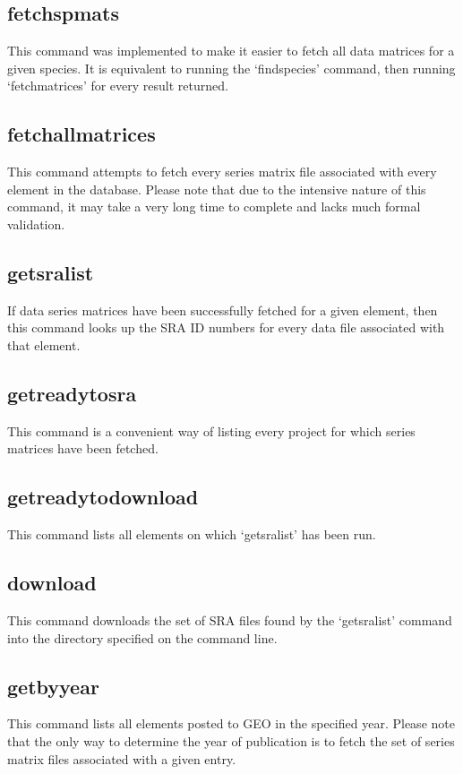 \documentclass[12pt,letterpaper]{article}
\begin{document}
\subsection{fetchspmats}
This command was implemented to make it easier to fetch all data matrices for a given species. It is equivalent to running the `findspecies' command, then running
`fetchmatrices' for every result returned.

\subsection{fetchallmatrices}
This command attempts to fetch every series matrix file associated with every element in the database. Please note that due to the intensive nature of this command,
it may take a very long time to complete and lacks much formal validation.

\subsection{getsralist}
If data series matrices have been successfully fetched for a given element, then this command looks up the SRA ID numbers for every data file associated
with that element.

\subsection{getreadytosra}
This command is a convenient way of listing every project for which series matrices have been fetched.

\subsection{getreadytodownload}
This command lists all elements on which `getsralist' has been run.

\subsection{download}
This command downloads the set of SRA files found by the `getsralist' command into the directory specified on the command line.

\subsection{getbyyear}
This command lists all elements posted to GEO in the specified year. Please note that the only way to determine the year of publication is to fetch the set of 
series matrix files associated with a given entry.
\end{document}
